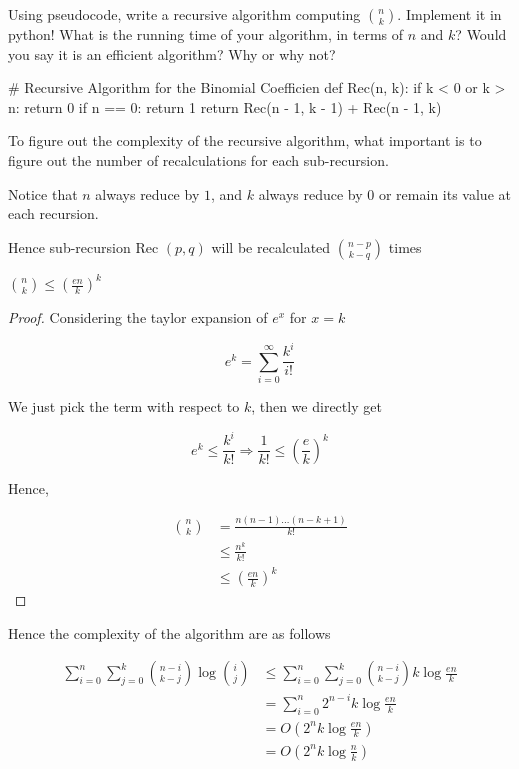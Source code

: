\documentclass[11pt,a4paper,oneside]{article}
\begin{document}
\begin{problem}{3} 
        Using pseudocode, write a recursive algorithm computing
        ${n \choose k}$. Implement it in python! What is 
        the running time of your algorithm, in terms of $n$ and $k$? Would you say it is an efficient
        algorithm? Why or why not?
    \solution
\begin{python}
# Recursive Algorithm for the Binomial Coefficien
def Rec(n, k):
    if k < 0 or k > n:
        return 0
    if n == 0:
	    return 1
    return Rec(n - 1, k - 1) + Rec(n - 1, k)
\end{python}
    
    To figure out the complexity of the recursive algorithm, what important is to figure out the number of recalculations for each sub-recursion.
    
    Notice that \( n \) always reduce by \( 1 \), and \( k \) always reduce by \(0\) or remain its value at each recursion.
    
    Hence sub-recursion Rec \( (p, q) \) will be recalculated \( {n - p \choose k - q} \) times
    
	\begin{lemma}
		\({n \choose k} \leq (\frac{en}{k})^k\)
	\begin{proof}
		Considering the taylor expansion of \(e^x\) for \(x = k\)
		
		\[
			e^k = \sum_{i=0}^{\infty} \frac{k^i}{i!}
		\]
		
		We just pick the term with respect to \(k\), then we directly get 
		
		\[
			e^k \leq \frac{k^i}{k!} \Rightarrow \frac{1}{k!} \leq (\frac{e}{k})^k
		\]
		
		Hence,
		
		\[
			\begin{split}
				{n \choose k} &= \frac{n(n-1)\dots(n-k+1)}{k!} \\
				&\leq \frac{n^k}{k!} \\
				&\leq (\frac{en}{k})^k
			\end{split}
		\]
		
    \end{proof}
    \end{lemma}
    Hence the complexity of the algorithm are as follows

    \[
	    \begin{split}
		    \sum_{i = 0}^{n} \sum_{j = 0}^{k} {n - i \choose k - j} \log{i \choose j}  &\leq \sum_{i = 0}^{n} \sum_{j = 0}^{k}  {n - i \choose k - j} k\log{\frac{en}{k}} \\
		    &= \sum_{i=0}^n 2^{n-i} k \log{\frac{en}{k}} \\
		    &= O(2^{n}k \log{\frac{en}{k}}) \\
		    &= O(2^{n}k \log{\frac{n}{k}})
	    \end{split}
	\]
	

\end{problem}
\end{document}
